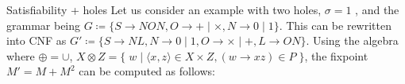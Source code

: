 \documentclass{beamer}
\newcommand{\hole}{\underline{\hspace{0.25cm}}}
\begin{document}
\begin{frame}[t,fragile]{Satisfiability + holes}
  Let us consider an example with two holes, $\sigma = 1$ \hole\phantom{.}\hole, and the grammar being $G\coloneqq\{S\rightarrow N O N, O \rightarrow + \mid \times, N \rightarrow 0 \mid 1\}$. This can be rewritten into CNF as $G'\coloneqq \{S \rightarrow N L, N \rightarrow 0 \mid 1, O \rightarrow \times \mid +, L \rightarrow O N\}$. Using the algebra where $\oplus=\cup$, $X \otimes Z = \big\{\;w \mid \langle x, z\rangle \in X \times Z, (w\rightarrow xz) \in P\;\big\}$, the fixpoint $M' = M + M^2$ can be computed as follows:\\\vspace{10pt}

\end{frame}
\end{document}
